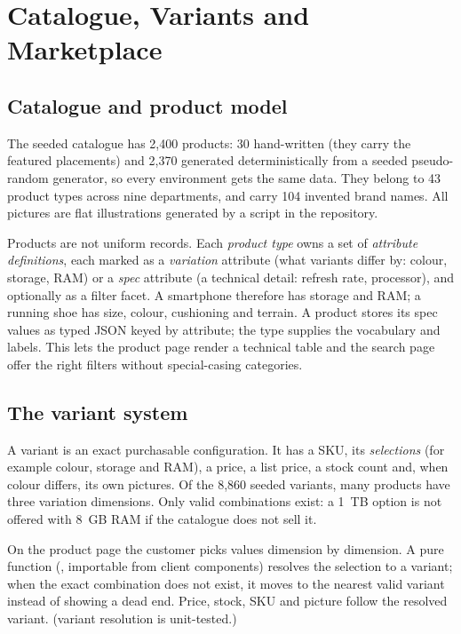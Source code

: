 \chapter{Catalogue, Variants and Marketplace}
\label{ch:catalogue}

\section{Catalogue and product model}

The seeded catalogue has 2,400 products: 30 hand-written (they carry the featured placements) and 2,370 generated deterministically from a seeded pseudo-random generator, so every environment gets the same data. They belong to 43 product types across nine departments, and carry 104 invented brand names. All pictures are flat illustrations generated by a script in the repository. \tagimpl{}

Products are not uniform records. Each \emph{product type} owns a set of \emph{attribute definitions}, each marked as a \emph{variation} attribute (what variants differ by: colour, storage, RAM) or a \emph{spec} attribute (a technical detail: refresh rate, processor), and optionally as a filter facet. A smartphone therefore has storage and RAM; a running shoe has size, colour, cushioning and terrain. A product stores its spec values as typed JSON keyed by attribute; the type supplies the vocabulary and labels. This lets the product page render a technical table and the search page offer the right filters without special-casing categories. \tagimpl{}

\section{The variant system}

A variant is an exact purchasable configuration. It has a SKU, its \emph{selections} (for example colour, storage and RAM), a price, a list price, a stock count and, when colour differs, its own pictures. Of the 8,860 seeded variants, many products have three variation dimensions. Only valid combinations exist: a 1~TB option is not offered with 8~GB RAM if the catalogue does not sell it. \tagimpl{}

On the product page the customer picks values dimension by dimension. A pure function (, importable from client components) resolves the selection to a variant; when the exact combination does not exist, it moves to the nearest valid variant instead of showing a dead end. Price, stock, SKU and picture follow the resolved variant. \tagtest{} (variant resolution is unit-tested.)

